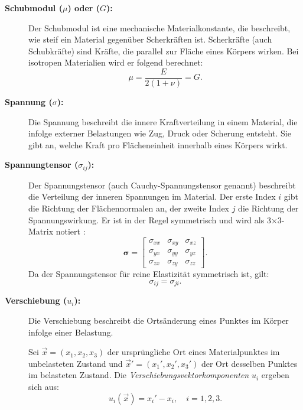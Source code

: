 \begin{description}
\item[\textbf{Schubmodul ($\mu$) oder ($G$):}] Der Schubmodul ist eine mechanische Materialkonstante, die beschreibt, wie steif ein Material gegenüber Scherkräften ist.
Scherkräfte (auch Schubkräfte) sind Kräfte, die parallel zur Fläche eines Körpers wirken. 
Bei isotropen Materialien wird er folgend berechnet:
	\begin{equation}
		\mu = 
		\frac{E}{2(1 + \nu)} =
		G.
	\end{equation}
\item[\textbf{Spannung ($\sigma$):}] Die Spannung beschreibt die innere Kraftverteilung in einem Material, die infolge externer Belastungen wie Zug, Druck oder Scherung entsteht. 
Sie gibt an, welche Kraft pro Flächeneinheit innerhalb eines Körpers wirkt.
	
\item[\textbf{Spannungtensor ($\sigma_{ij}$):}] Der Spannungstensor (auch Cauchy-Spannungstensor genannt) beschreibt die Verteilung der inneren Spannungen im Material. 
Der erste Index	$i$ gibt die Richtung der Flächennormalen an, der zweite Index $j$ die Richtung der Spannungswirkung. 
Er ist in der Regel symmetrisch und wird als 3×3-Matrix notiert \cite{elastomechanik:Grundlagen_der_Elastizitaetstheorie}:
	\begin{equation}
		\boldsymbol{\sigma} =
		\begin{bmatrix}
			\sigma_{xx} & \sigma_{xy} & \sigma_{xz} \\
			\sigma_{yx} & \sigma_{yy} & \sigma_{yz} \\
			\sigma_{zx} & \sigma_{zy} & \sigma_{zz}
		\end{bmatrix}.
	\end{equation}
Da der Spannungstensor für reine Elastizität symmetrisch ist, gilt:
	\begin{equation}
		\sigma_{ij} = 
		\sigma_{ji}.
	\end{equation}
	
\item[\textbf{Verschiebung ($u_i$):}] Die Verschiebung beschreibt die Ortsänderung eines Punktes im Körper infolge einer Belastung.

Sei $\vec{x} = (x_1, x_2, x_3)$ der ursprüngliche Ort eines Materialpunktes im unbelasteten Zustand und $\vec{x}' = (x_1', x_2', x_3')$ der Ort desselben Punktes im belasteten Zustand.  
Die \emph{Verschiebungsvektorkomponenten} $u_i$ ergeben sich aus:
\begin{equation}
	u_i(\vec{x}) = x_i' - x_i,
	\quad i = 1,2,3.
\end{equation}


\end{description}
